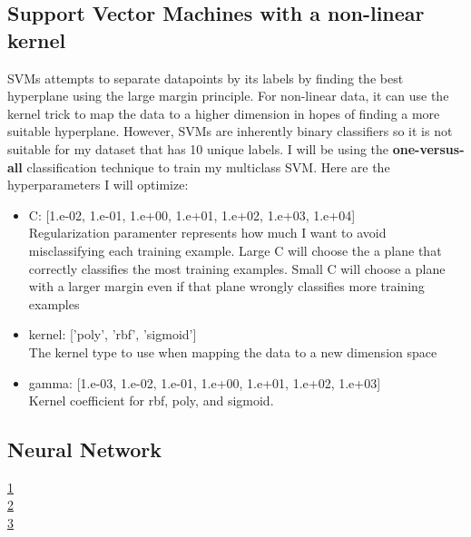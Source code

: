 \documentclass[12pt]{article}
\newcommand{\nextproblem}{
	\vfill
	\pagebreak
}
\begin{document}
\subsection{Support Vector Machines with a non-linear kernel}
SVMs attempts to separate datapoints by its labels by finding the best hyperplane using the large margin principle. For non-linear data, it can use the kernel trick to map the data to a higher dimension in hopes of finding a more suitable hyperplane. However, SVMs are inherently binary classifiers so it is not suitable for my dataset that has 10 unique labels. I will be using the \textbf{one-versus-all} classification technique to train my multiclass SVM. Here are the hyperparameters I will optimize:
\begin{itemize}
    \item C: [1.e-02, 1.e-01, 1.e+00, 1.e+01, 1.e+02, 1.e+03, 1.e+04]
    \\ Regularization paramenter represents how much I want to avoid misclassifying each training example. Large C will choose the a plane that correctly classifies the most training examples. Small C will choose a plane with a larger margin even if that plane wrongly classifies more training examples
    \item kernel: ['poly', 'rbf', 'sigmoid'] 
    \\ The kernel type to use when mapping the data to a new dimension space
    \item gamma: [1.e-03, 1.e-02, 1.e-01, 1.e+00, 1.e+01, 1.e+02, 1.e+03]
    \\ Kernel coefficient for rbf, poly, and sigmoid.
\end{itemize}

\subsection{Neural Network}

\nextproblem

\href{https://www.quora.com/What-are-C-and-gamma-with-regards-to-a-support-vector-machine}{1} \\
\href{https://scikit-learn.org/stable/auto_examples/svm/plot_rbf_parameters.html}{2} \\
\href{https://machinelearningmastery.com/save-load-machine-learning-models-python-scikit-learn/}{3} \\
\end{document}
